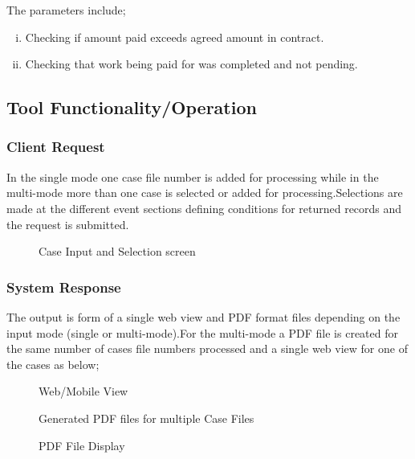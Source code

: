 \noindent The parameters include;

\begin{enumerate}[(i)]
\item Checking if amount paid exceeds agreed amount in contract.
\item Checking that work being paid for was completed and not pending.
\end{enumerate}

\subsection{Tool Functionality/Operation}

\subsubsection{Client Request}

\noindent In the single mode  one case file number is added for processing while in the multi-mode more than one case is selected or added for processing.Selections are made at the different event sections defining conditions for returned records and the request is submitted.

\begin{center}
\begin{figure}[h]
\caption{Case Input and Selection screen}

\end{figure}
\end{center}


\subsubsection{System Response}

\noindent The output is form of a single web view and PDF format files depending on the input mode (single or multi-mode).For the multi-mode a PDF file is created for the same number of cases file numbers processed and a single web view for one of the cases as below;

\begin{center}
\begin{figure}[h]
\caption{Web/Mobile View }

\end{figure}
\end{center}

\begin{center}
\begin{figure}[h]
\caption{Generated PDF files for multiple Case Files}

\end{figure}
\end{center}

\begin{center}
\begin{figure}[h]
\caption{PDF File Display}

\end{figure}
\end{center}

